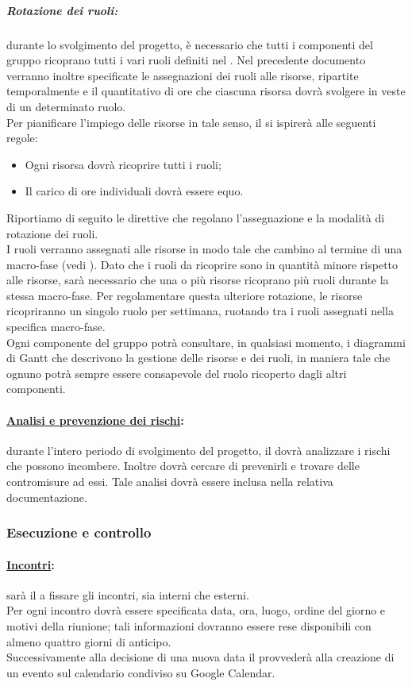 \subparagraph{Rotazione dei ruoli:} durante lo svolgimento del progetto, è necessario che tutti i componenti del gruppo ricoprano tutti i vari ruoli definiti nel \PdP{}. Nel precedente documento verranno inoltre specificate le assegnazioni dei ruoli alle risorse, ripartite temporalmente e il quantitativo di ore che ciascuna risorsa dovrà svolgere in veste di un determinato ruolo.\\
Per pianificare l'impiego delle risorse in tale senso, il \projectManager{} si ispirerà alle seguenti regole:
\begin{itemize}
	\item Ogni risorsa dovrà ricoprire tutti i ruoli;
	\item Il carico di ore individuali dovrà essere equo.
\end{itemize}
Riportiamo di seguito le direttive che regolano l'assegnazione e la modalità di rotazione dei ruoli.\\
I ruoli verranno assegnati alle risorse in modo tale che cambino al termine di una macro-fase (vedi \PdP). Dato che i ruoli da ricoprire sono in quantità minore rispetto alle risorse, sarà necessario che una o più risorse ricoprano più ruoli durante la stessa macro-fase. Per regolamentare questa ulteriore rotazione, le risorse ricopriranno un singolo ruolo per settimana, ruotando tra i ruoli assegnati nella specifica macro-fase.\\
Ogni componente del gruppo potrà consultare, in qualsiasi momento, i diagrammi di Gantt\glossario{} che descrivono la gestione delle risorse e dei ruoli, in maniera tale che ognuno potrà sempre essere consapevole del ruolo ricoperto dagli altri componenti.

\paragraph{\underline{Analisi e prevenzione dei rischi}:} durante l'intero periodo di svolgimento del progetto, il \projectManager{} dovrà analizzare i rischi che possono incombere. Inoltre dovrà cercare di prevenirli e trovare delle contromisure ad essi. Tale analisi dovrà essere inclusa nella relativa documentazione.

\subsubsection{Esecuzione e controllo}
\label{esecuzionecontrollo}

\paragraph{\underline{Incontri}:} sarà il \projectManager{} a fissare gli incontri, sia interni che esterni.
\\Per ogni incontro dovrà essere specificata data, ora, luogo, ordine del giorno e motivi della riunione; tali informazioni dovranno essere rese disponibili con almeno quattro giorni di anticipo.
\\Successivamente alla decisione di una nuova data il \projectManager{} provvederà alla creazione di un evento sul calendario condiviso su Google Calendar\glossario{}.

